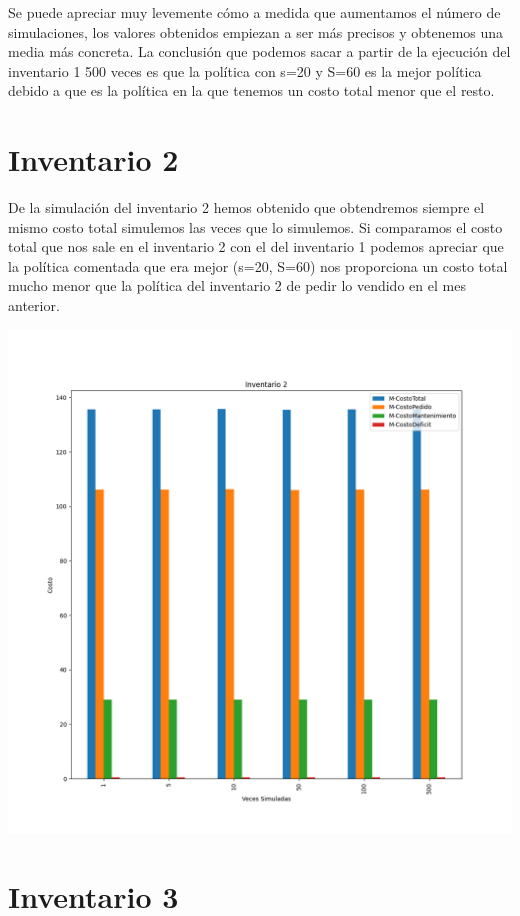 \documentclass[11pt,a4paper]{report}
\begin{document}
Se puede apreciar muy levemente cómo a medida que aumentamos el número de simulaciones, los valores obtenidos empiezan a ser más precisos y obtenemos una media más concreta. 
La conclusión que podemos sacar a partir de la ejecución del inventario 1 500 veces es que la política con s=20 y S=60 es la mejor política debido a que es la política en la que tenemos un costo total menor que el resto.

\section{Inventario 2}

De la simulación del inventario 2 hemos obtenido que obtendremos siempre el mismo costo total simulemos las veces que lo simulemos. Si comparamos el costo total que nos sale en el inventario 2 con el del inventario 1 podemos apreciar que la política comentada que era mejor (s=20, S=60) nos proporciona un costo total mucho menor que la política del inventario 2 de pedir lo vendido en el mes anterior.

\begin{center}
	\includegraphics[width=0.45\textheight]{img/Cap-2/inventario-2/inventario2.png}
\end{center}

\section{Inventario 3}
\end{document}
